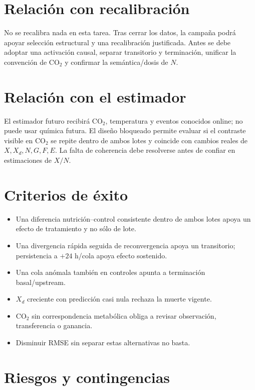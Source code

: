 \documentclass[11pt,a4paper]{article}
\begin{document}
\section{Relación con recalibración}

No se recalibra nada en esta tarea. Tras cerrar los datos, la campaña podrá
apoyar selección estructural y una recalibración justificada. Antes se debe
adoptar una activación causal, separar transitorio y terminación, unificar la
convención de CO$_2$ y confirmar la semántica/dosis de \(N\).

\section{Relación con el estimador}

El estimador futuro recibirá CO$_2$, temperatura y eventos conocidos online; no
puede usar química futura. El diseño bloqueado permite evaluar si el contraste
visible en CO$_2$ se repite dentro de ambos lotes y coincide con cambios reales
de \(X,X_d,N,G,F,E\). La falta de coherencia debe resolverse antes de confiar en
estimaciones de \(X/N\).

\section{Criterios de éxito}

\begin{itemize}[leftmargin=*]
  \item Una diferencia nutrición--control consistente dentro de ambos lotes
  apoya un efecto de tratamiento y no sólo de lote.
  \item Una divergencia rápida seguida de reconvergencia apoya un transitorio;
  persistencia a \(+24\) h/cola apoya efecto sostenido.
  \item Una cola anómala también en controles apunta a terminación basal/upstream.
  \item \(X_d\) creciente con predicción casi nula rechaza la muerte vigente.
  \item CO$_2$ sin correspondencia metabólica obliga a revisar observación,
  transferencia o ganancia.
  \item Disminuir RMSE sin separar estas alternativas no basta.
\end{itemize}

\section{Riesgos y contingencias}
\end{document}
